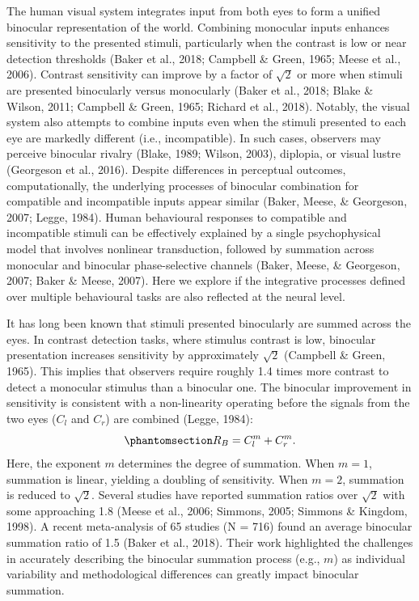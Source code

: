 \documentclass[
  12pt,
]{article}
\begin{document}
The human visual system integrates input from both eyes to form a
unified binocular representation of the world. Combining monocular
inputs enhances sensitivity to the presented stimuli, particularly when
the contrast is low or near detection thresholds (Baker et al., 2018;
Campbell \& Green, 1965; Meese et al., 2006). Contrast sensitivity can
improve by a factor of \(\sqrt{2}\) or more when stimuli are presented
binocularly versus monocularly (Baker et al., 2018; Blake \& Wilson,
2011; Campbell \& Green, 1965; Richard et al., 2018). Notably, the
visual system also attempts to combine inputs even when the stimuli
presented to each eye are markedly different (i.e., incompatible). In
such cases, observers may perceive binocular rivalry (Blake, 1989;
Wilson, 2003), diplopia, or visual lustre (Georgeson et al., 2016).
Despite differences in perceptual outcomes, computationally, the
underlying processes of binocular combination for compatible and
incompatible inputs appear similar (Baker, Meese, \& Georgeson, 2007;
Legge, 1984). Human behavioural responses to compatible and incompatible
stimuli can be effectively explained by a single psychophysical model
that involves nonlinear transduction, followed by summation across
monocular and binocular phase-selective channels (Baker, Meese, \&
Georgeson, 2007; Baker \& Meese, 2007). Here we explore if the
integrative processes defined over multiple behavioural tasks are also
reflected at the neural level.

It has long been known that stimuli presented binocularly are summed
across the eyes. In contrast detection tasks, where stimulus contrast is
low, binocular presentation increases sensitivity by approximately
\(\sqrt{2}\) (Campbell \& Green, 1965). This implies that observers
require roughly 1.4 times more contrast to detect a monocular stimulus
than a binocular one. The binocular improvement in sensitivity is
consistent with a non-linearity operating before the signals from the
two eyes (\(C_l\) and \(C_r\)) are combined (Legge, 1984):
\begin{equation}\phantomsection\label{eq-IntroMath1}{
R_B = C_l^m + C_r^m.
}\end{equation} Here, the exponent \(m\) determines the degree of
summation. When \(m = 1\), summation is linear, yielding a doubling of
sensitivity. When \(m = 2\), summation is reduced to \(\sqrt{2}\).
Several studies have reported summation ratios over \(\sqrt{2}\) with
some approaching 1.8 (Meese et al., 2006; Simmons, 2005; Simmons \&
Kingdom, 1998). A recent meta-analysis of 65 studies (N = 716) found an
average binocular summation ratio of 1.5 (Baker et al., 2018). Their
work highlighted the challenges in accurately describing the binocular
summation process (e.g., \(m\)) as individual variability and
methodological differences can greatly impact binocular summation.
\end{document}
